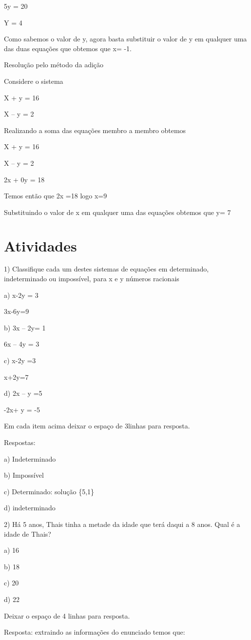 5y = 20

Y = 4

Como sabemos o valor de y, agora basta substituir o valor de y em
qualquer uma das duas equações que obtemos que x= -1.

Resolução pelo método da adição

Considere o sistema

X + y = 16

X -- y = 2

Realizando a soma das equações membro a membro obtemos

X + y = 16

X -- y = 2

2x + 0y = 18

Temos então que 2x =18 logo x=9

Substituindo o valor de x em qualquer uma das equações obtemos que y= 7

\section{Atividades}

1) Classifique cada um destes sistemas de equações em determinado,
indeterminado ou impossível, para x e y números racionais

a) x-2y = 3

3x-6y=9

b) 3x -- 2y= 1

6x -- 4y = 3

c) x-2y =3

x+2y=7

d) 2x -- y =5

-2x+ y = -5

Em cada item acima deixar o espaço de 3linhas para resposta.

Respostas:

a) Indeterminado

b) Impossível

c) Determinado: solução \{5,1\}

d) indeterminado

2) Há 5 anos, Thais tinha a metade da idade que terá daqui a 8 anos.
Qual é a idade de Thais?

a) 16

b) 18

c) 20

d) 22

Deixar o espaço de 4 linhas para resposta.

Resposta: extraindo as informações do enunciado temos que:


